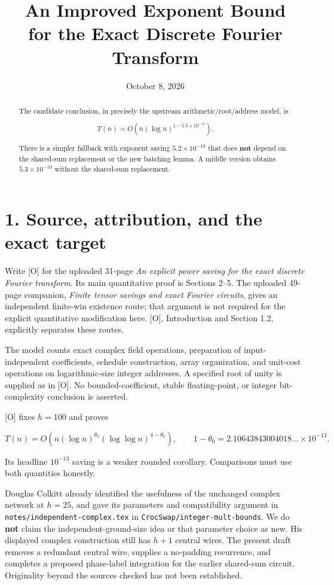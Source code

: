 \documentclass[
  11pt,
  letterpaper,
]{article}
\title{An Improved Exponent Bound\\for the Exact Discrete Fourier Transform}
\subtitle{Research draft\par\vspace{-22pt}}
\author{}
\date{October 8, 2026}
\begin{document}
\maketitle
\begin{abstract}
The candidate conclusion, in precisely the upstream
arithmetic/root/address model, is

\[
\boxed{T(n)=O\!\left(n(\log n)^{1-5.5\times10^{-10}}\right).}
\]

There is a simpler fallback with exponent saving \(5.2\times10^{-10}\)
that does \textbf{not} depend on the shared-sum replacement or the new
batching lemma. A middle version obtains \(5.3\times10^{-10}\) without
the shared-sum replacement.
\end{abstract}

\section{1. Source, attribution, and the exact
target}\label{source-attribution-and-the-exact-target}

Write {[}O{]} for the uploaded 31-page \emph{An explicit power saving
for the exact discrete Fourier transform}. Its main quantitative proof
is Sections 2--5. The uploaded 49-page companion, \emph{Finite tensor
savings and exact Fourier circuits}, gives an independent finite-win
existence route; that argument is not required for the explicit
quantitative modification here. {[}O{]}, Introduction and Section 1.2,
explicitly separates these routes.

The model counts exact complex field operations, preparation of
input-independent coefficients, schedule construction, array
organization, and unit-cost operations on logarithmic-size integer
addresses. A specified root of unity is supplied as in {[}O{]}. No
bounded-coefficient, stable floating-point, or integer bit-complexity
conclusion is asserted.

{[}O{]} fixes \(h=100\) and proves

\[
T(n)=O\!\left(n(\log n)^{\theta_0}(\log\log n)^{4-\theta_0}\right),
\qquad 1-\theta_0=2.10643843004018\ldots\times10^{-13}.
\]

Its headline \(10^{-13}\) saving is a weaker rounded corollary.
Comparisons must use both quantities honestly.

Douglas Colkitt already identified the usefulness of the unchanged
complex network at \(h=25\), and gave its parameters and compatibility
argument in \texttt{notes/independent-complex.tex} in
\texttt{CrocSwap/integer-mult-bounds}. We do \textbf{not} claim the
independent-ground-size idea or that parameter choice as new. His
displayed complex construction still has \(h+1\) central wires. The
present draft removes a redundant central wire, supplies a no-padding
recurrence, and completes a proposed phase-label integration for the
earlier shared-sum circuit. Originality beyond the sources checked has
not been established.
\end{document}

